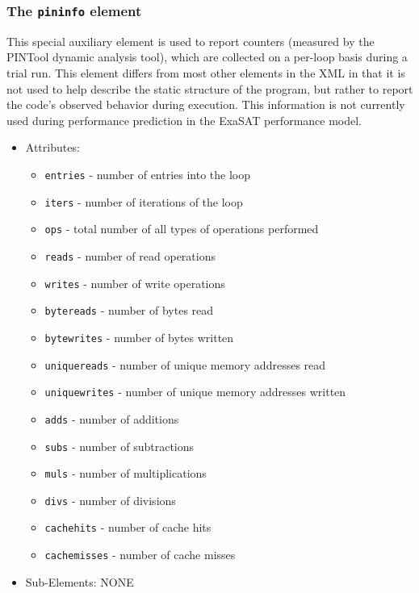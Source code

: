 \documentclass{article}
\begin{document}
\subsubsection{The {\tt pininfo} element}
  This special auxiliary element is used to report counters (measured
  by the PINTool dynamic analysis tool), which are collected on a
  per-loop basis during a trial run.  This element differs from most
  other elements in the XML in that it is not used to help describe
  the static structure of the program, but rather to report the code's
  observed behavior during execution.  This information is not currently
  used during performance prediction in the ExaSAT performance model.
  \begin{itemize}
    \item Attributes:
    \begin{itemize}
      \item {\tt entries} - number of entries into the loop
      \item {\tt iters} - number of iterations of the loop
      \item {\tt ops} - total number of all types of operations performed
      \item {\tt reads} - number of read operations
      \item {\tt writes} - number of write operations
      \item {\tt bytereads} - number of bytes read
      \item {\tt bytewrites} - number of bytes written
      \item {\tt uniquereads} - number of unique memory addresses read
      \item {\tt uniquewrites} - number of unique memory addresses written
      \item {\tt adds} - number of additions
      \item {\tt subs} - number of subtractions
      \item {\tt muls} - number of multiplications
      \item {\tt divs} - number of divisions
      \item {\tt cachehits} - number of cache hits
      \item {\tt cachemisses} - number of cache misses
    \end{itemize}
    \item Sub-Elements: NONE
  \end{itemize}
\end{document}
